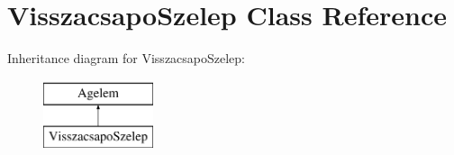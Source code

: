 \hypertarget{class_visszacsapo_szelep}{}\section{Visszacsapo\+Szelep Class Reference}
\label{class_visszacsapo_szelep}
Inheritance diagram for Visszacsapo\+Szelep\+:\begin{figure}[H]
\begin{center}
\leavevmode
\includegraphics[height=2.000000cm]{class_visszacsapo_szelep}
\end{center}
\end{figure}
